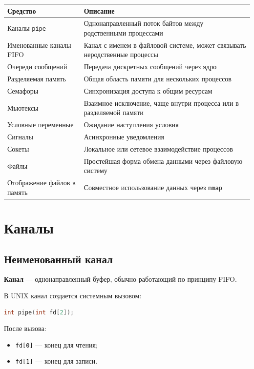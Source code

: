 \documentclass[12pt,a4paper]{article}
\begin{document}
\begin{longtable}{|p{4cm}|p{9cm}|}
\hline
\textbf{Средство} & \textbf{Описание} \\
\hline
Каналы \texttt{pipe} & Однонаправленный поток байтов между родственными процессами \\
\hline
Именованные каналы FIFO & Канал с именем в файловой системе, может связывать неродственные процессы \\
\hline
Очереди сообщений & Передача дискретных сообщений через ядро \\
\hline
Разделяемая память & Общая область памяти для нескольких процессов \\
\hline
Семафоры & Синхронизация доступа к общим ресурсам \\
\hline
Мьютексы & Взаимное исключение, чаще внутри процесса или в разделяемой памяти \\
\hline
Условные переменные & Ожидание наступления условия \\
\hline
Сигналы & Асинхронные уведомления \\
\hline
Сокеты & Локальное или сетевое взаимодействие процессов \\
\hline
Файлы & Простейшая форма обмена данными через файловую систему \\
\hline
Отображение файлов в память & Совместное использование данных через \texttt{mmap} \\
\hline
\end{longtable}

\section{Каналы}

\subsection{Неименованный канал}

\textbf{Канал} --- однонаправленный буфер, обычно работающий по принципу FIFO.

В UNIX канал создается системным вызовом:

\begin{lstlisting}[language=C]
int pipe(int fd[2]);
\end{lstlisting}

После вызова:
\begin{itemize}
    \item \texttt{fd[0]} --- конец для чтения;
    \item \texttt{fd[1]} --- конец для записи.
\end{itemize}
\end{document}
